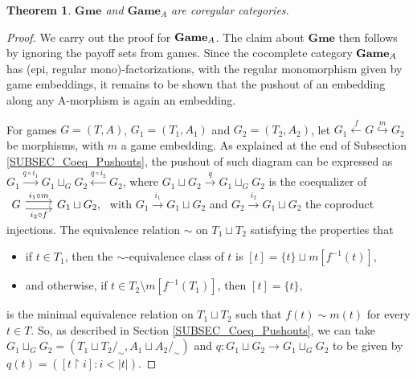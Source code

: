 \documentclass[12pt]{amsart}
\newtheorem{thm}{Theorem}[section]
\theoremstyle{definition}
\newcommand{\seq}[1]{{\left( {#1} \right)}}
\newcommand{\A}{\textup{\textmd{\textsc{A}}}}
\DeclareMathOperator{\restrict}{\upharpoonright}
\newcommand{\Games}{\mathbf{Game}}
\newcommand{\Gmes}{\mathbf{Gme}}
\begin{document}
\begin{thm}
	$\Gmes$ and $\Games_{A}$ are coregular categories.
\end{thm}
\begin{proof}
	We carry out the proof for $\Games_{\A}$. The claim about $\Gmes$ then follows by ignoring the payoff sets from games.
	Since the cocomplete category  $\Games_\A$ has (epi, regular mono)-factorizations, with the regular monomorphism given by game embeddings, it remains to be shown that the pushout of an embedding along any A-morphism is again an embedding.
	
	For games $G=(T,A)$, $G_1 = (T_1,A_1)$ and $G_2 = (T_2,A_2)$, let $G_{1} \stackrel{f}{\leftarrow} G\stackrel{m}{\hookrightarrow} G_2$ be morphisms,  with $m$ a game embedding. As explained at the end of Subsection \ref{SUBSEC_Coeq_Pushouts}, the pushout of such diagram can be expressed as $G_1 \stackrel{q\circ i_1}{\longrightarrow}G_1{\sqcup}_{G} G_2\stackrel{q\circ i_2}{\longleftarrow}G_2$, where $G_1\sqcup G_2\stackrel{q}{\to}G_1{\sqcup}_{G} G_2$ is the coequalizer of $\begin{tikzcd}[column sep=normal,row sep=huge]
		G \arrow[r,shift left=.75ex,"i_1\circ m"] \arrow[r,shift right=.75ex,"i_2\circ f"{below}]  &
		G_1\sqcup G_2,
	\end{tikzcd}$
	with $G_1\stackrel{i_1}{\to}G_1\sqcup G_2$ and $G_2\stackrel{i_2}{\to}G_1\sqcup G_2$ the coproduct injections.
	The equivalence relation $\sim$ on $T_1\sqcup T_2$ satisfying the properties that
	\begin{itemize}
		\item if $t\in T_1$, then the $\sim$-equivalence class of $t$ is $[t] = \{t\}\sqcup m[f^{-1}(t)]$,
		\item and otherwise, if $t\in T_2 \setminus m[f^{-1}(T_1)]$, then $[t] = \{t\}$,
	\end{itemize}
	is the minimal equivalence relation on $T_1\sqcup T_2$ such that $f(t)\sim m(t)$ for every $t\in T$. So, as described in Section \ref{SUBSEC_Coeq_Pushouts}, we can take $G_1\sqcup_G G_2= (T_1\sqcup T_2/_\sim, A_1\sqcup A_2/_\sim )$ and $q\colon G_1\sqcup G_2\to G_1\sqcup_G G_2$ to be given by $q(t)=\seq{[t\restrict i]:i<|t|}$.
	

\end{proof}
\end{document}
